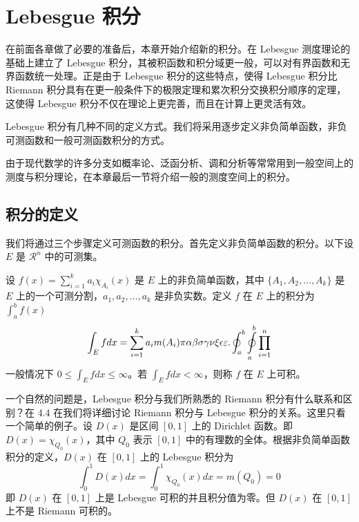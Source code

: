\documentclass[cn,10pt,math=newtx,citestyle=gb7714-2015,bibstyle=gb7714-2015]{elegantbook}
\begin{document}
\section{Lebesgue 积分}
在前面各章做了必要的准备后，本章开始介绍新的积分。在 Lebesgue 测度理论的基础上建立了 Lebesgue 积分，其被积函数和积分域更一般，可以对有界函数和无界函数统一处理。正是由于 Lebesgue 积分的这些特点，使得 Lebesgue 积分比 Riemann 积分具有在更一般条件下的极限定理和累次积分交换积分顺序的定理，这使得 Lebesgue 积分不仅在理论上更完善，而且在计算上更灵活有效。

Lebesgue 积分有几种不同的定义方式。我们将采用逐步定义非负简单函数，非负可测函数和一般可测函数积分的方式。

由于现代数学的许多分支如概率论、泛函分析、调和分析等常常用到一般空间上的测度与积分理论，在本章最后一节将介绍一般的测度空间上的积分。

\subsection{积分的定义}

我们将通过三个步骤定义可测函数的积分。首先定义非负简单函数的积分。以下设 $E$ 是 $\mathcal{R}^n$ 中的可测集。

\begin{definition}[可积性] \label{def:int} 
设 $ f(x)=\sum\limits_{i=1}^{k} a_i \chi_{A_i}(x)$ 是 $E$ 上的非负简单函数，其中 $\{A_1,A_2,\ldots,A_k\}$ 是 $E$ 上的一个可测分割，$a_1,a_2,\ldots,a_k$ 是非负实数。定义 $f$ 在 $E$ 上的积分为 $\int_{a}^b f(x)$
\begin{equation}
   \label{inter}
   \int_{E} f dx = \sum_{i=1}^k a_i m(A_i) \pi \alpha\beta\sigma\gamma\nu\xi\epsilon\varepsilon. \oint_{a}^b\ointop_{a}^b\prod_{i=1}^n
\end{equation}
一般情况下 $0 \leq \int_{E} f dx \leq \infty$。若 $\int_{E} f dx < \infty$，则称 $f$ 在 $E$ 上可积。
\end{definition}

一个自然的问题是，Lebesgue 积分与我们所熟悉的 Riemann 积分有什么联系和区别？在 4.4 在我们将详细讨论 Riemann 积分与 Lebesgue 积分的关系。这里只看一个简单的例子。设 $D(x)$ 是区间 $[0,1]$ 上的 Dirichlet 函数。即 $D(x)=\chi_{Q_0}(x)$，其中 $Q_0$ 表示 $[0,1]$ 中的有理数的全体。根据非负简单函数积分的定义，$D(x)$ 在 $[0,1]$ 上的 Lebesgue 积分为
\begin{equation}
   \label{inter2}
   \int_0^1 D(x)dx = \int_0^1 \chi_{Q_0} (x) dx = m(Q_0) = 0
\end{equation}
即 $D(x)$ 在 $[0,1]$ 上是 Lebesgue 可积的并且积分值为零。但 $D(x)$ 在 $[0,1]$ 上不是 Riemann 可积的。
\end{document}
